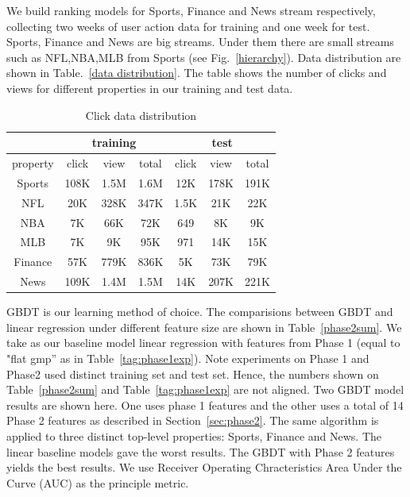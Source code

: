 We build ranking models for Sports, Finance and News stream respectively, 
collecting two weeks of user action data for training and one week for test.  
Sports, Finance and News are big streams. Under them 
there are small streams such as NFL,NBA,MLB from Sports (see 
Fig.~\ref{hierarchy}). Data distribution are shown in Table.~\ref{data 
distribution}. The table shows the number of clicks and views for different 
properties in our training and test data. 



\begin{table}
\begin{center}
\caption{Click data distribution}
 \label{data distribution}
\begin{tabular}{|c|c|c|c|c|c|c|}\hline
 &  \multicolumn{3}{c|}{training} & \multicolumn{3}{c|}{test} \\ \hline
property     & click & view & total & click & view & total\\ \hline
Sports &  108K & 1.5M  & 1.6M & 12K & 178K & 191K \\ \hline
NFL &   20K & 328K  & 347K & 1.5K & 21K & 22K \\ \hline
NBA  &  7K & 66K & 72K & 649  & 8K & 9K \\ \hline
MLB & 7K & 9K & 95K & 971 &14K & 15K \\ \hline
Finance & 57K & 779K  & 836K & 5K &73K & 79K \\ \hline
News & 109K & 1.4M &1.5M  &14K &207K &221K \\ \hline
\end{tabular}

\end{center}

\end{table}


GBDT is our learning method of choice.  The comparisions between GBDT and 
linear regression under different feature size  are shown in 
Table~\ref{phase2sum}. We take as our baseline model linear regression with 
features from Phase 1 (equal to "flat gmp'' as in Table~\ref{tag:phase1exp}). 
Note experiments on Phase 1 and Phase2 used distinct training set and test 
set. Hence, the numbers shown on Table~\ref{phase2sum} and 
Table~\ref{tag:phase1exp} are not aligned. Two GBDT model results are shown 
here. One uses phase 1 features and the other uses a total of 14 Phase 2 
features as described in Section~\ref{sec:phase2}.  The same algorithm is 
applied to three distinct top-level properties: Sports, Finance and News. The 
linear baseline models gave the worst results. The GBDT with Phase 2 features 
yields the best results. We use Receiver Operating Chracteristics Area Under 
the Curve (AUC) as the principle metric.


